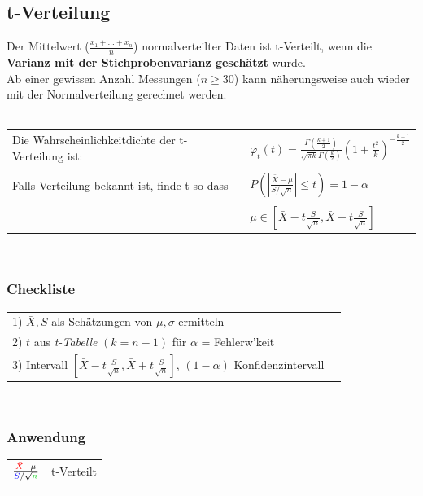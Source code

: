 	\subsection{t-Verteilung }
	Der Mittelwert ($\frac{x_1+\ldots+x_n}{n}$) normalverteilter Daten ist
    t-Verteilt, wenn die \textbf{Varianz mit der Stichprobenvarianz geschätzt} wurde.\\
    Ab einer gewissen Anzahl Messungen ($n \geq 30$) kann näherungsweise auch wieder mit
    der Normalverteilung gerechnet werden.  \\ \\
	\begin{tabular}{p{10cm}p{8cm}}
    Die Wahrscheinlichkeitdichte der
    t-Verteilung ist: &$\varphi_t(t)=\frac{\Gamma (\frac{k+1}{2})}{\sqrt{\pi
    k}\Gamma(\frac{k}{2})}\left(1+\frac{t^2}{k}\right)^{- \frac{k+1}{2}}$\\ \\
    Falls Verteilung bekannt ist, finde t so dass
    &$P\left(\left|\frac{\bar{X}-\mu}{S / \sqrt{n}}\right|\leq t\right) = 1 - \alpha$\\ \\
    &$\mu\in\left[\bar{X}-t\frac{S}{\sqrt{n}},\bar{X}+t\frac{S}{\sqrt{n}}\right]$\\
    \end{tabular}\\
	\begin{minipage}{10cm}
 		\subsubsection{Checkliste}
		\begin{tabular}{ll}
        1) $\bar{X}, S$ als Schätzungen von $\mu, \sigma$ ermitteln\\
        2) $t$ aus {\em t-Tabelle} $(k=n-1)$ für $\alpha$ = Fehlerw'keit\\
        3) Intervall
        $\left[\bar{X}-t\frac{S}{\sqrt{n}},\bar{X}+t\frac{S}{\sqrt{n}}\right]$,
        $(1-\alpha)$ Konfidenzintervall
        \end{tabular}\\
		\subsubsection{Anwendung}
		\begin{tabular}{ll}
        $\frac{\textcolor{red}{\bar{X}}-\mu}{\textcolor{blue}{S}/\sqrt{\textcolor{green}{n}}}$
        & t-Verteilt\\ \\
        \end{tabular}
    
    \end{minipage}
